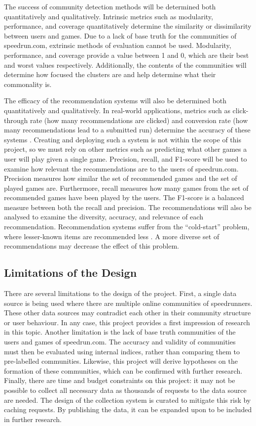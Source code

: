 The success of community detection methods will be determined both quantitatively and qualitatively. Intrinsic metrics such as modularity, performance, and coverage quantitatively determine the similarity or dissimilarity between users and games. Due to a lack of base truth for the communities of speedrun.com, extrinsic methods of evaluation cannot be used.  Modularity, performance, and coverage provide a value between 1 and 0, which are their best and worst values respectively. Additionally, the contents of the communities will determine how focused the clusters are and help determine what their commonality is.


The efficacy of the recommendation systems will also be determined both quantitatively and qualitatively. In real-world applications, metrics such as click-through rate (how many recommendations are clicked) and conversion rate (how many recommendations lead to a submitted run) determine the accuracy of these systems \cite{Cui_2021}. Creating and deploying such a system is not within the scope of this project, so we must rely on other metrics such as predicting what other games a user will play given a single game. Precision, recall, and F1-score will be used to examine how relevant the recommendations are to the users of speedrun.com. Precision measures how similar the set of recommended games and the set of played games are. Furthermore, recall measures how many games from the set of recommended games have been played by the users. The F1-score is a balanced measure between both the recall and precision. The recommendations will also be analysed to examine the diversity, accuracy, and relevance of each recommendation. Recommendation systems suffer from the ``cold-start'' problem, where lesser-known items are recommended less \cite{Eirinaki_Gao_Varlamis_Tserpes_2018}. A more diverse set of recommendations may decrease the effect of this problem. 

\subsection{Limitations of the Design}
\vspace{-5pt}

There are several limitations to the design of the project. First, a single data source is being used where there are multiple online communities of speedrunners. These other data sources may contradict each other in their community structure or user behaviour. In any case, this project provides a first impression of research in this topic. Another limitation is the lack of base truth communities of the users and games of speedrun.com. The accuracy and validity of communities must then be evaluated using internal indices, rather than comparing them to pre-labelled communities. Likewise, this project will derive hypotheses on the formation of these communities, which can be confirmed with further research. Finally, there are time and budget constraints on this project: it may not be possible to collect all necessary data as thousands of requests to the data source are needed. The design of the collection system is curated to mitigate this risk by caching requests. By publishing the data, it can be expanded upon to be included in further research.